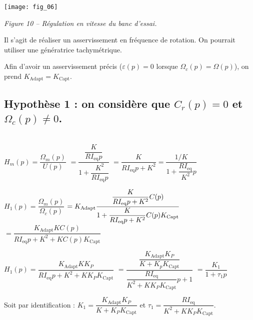 \begin{multicols}{2}
\begin{center}
\texttt{[image: fig\_06]}

\textit{Figure 10 -- Régulation en vitesse du banc d'essai.}
\end{center}
\fi


\ifprof
\begin{corrige}
Il s'agit de réaliser un asservissement en fréquence de rotation. On pourrait utiliser une génératrice tachymétrique. 

Afin d'avoir un asservissement précis ($\varepsilon(p)=0$ lorsque $\Omega_c(p)=\Omega(p)$), on prend $K_{\text{Adapt}}=K_{\text{Capt}}$.
\end{corrige}
\else
\fi


\subsection*{Hypothèse 1 : on considère que $C_r (p)=0$ et $\Omega_c (p)\neq 0$.}

\ifprof
\begin{corrige}
~\\

$H_m (p)=\dfrac{\Omega_m (p)}{U(p)} $
$= \dfrac{\dfrac{K}{RI_{\text{eq}}p}}{1+\dfrac{K^2}{ RI_{\text{eq}}p}}$
$=\dfrac{K}{R I_{\text{eq}} p+K^2  }=\dfrac{1/K}{1+\dfrac{RI_{\text{eq}}}{K^2}p}$


$H_1 (p)=\dfrac{\Omega_m (p)}{\Omega_c (p)} $
$=K_{\text{Adapt}} \dfrac{\dfrac{K}{R I_{\text{eq}} p+K^2 } C(p)}{%
1+\dfrac{K}{R I_{\text{eq}} p+K^2 } C(p) K_{\text{Capt}} }$
$=\dfrac{K_{\text{Adapt}} K C(p)}{R I_{\text{eq}} p+K^2+K C(p) K_{\text{Capt}} }$


$H_1 (p)=\dfrac{K_{\text{Adapt}} K K_P}{R I_{\text{eq}} p+K^2+K K_P K_{\text{Capt}}}$
$=\dfrac{\dfrac{K_{\text{Adapt}} K_P}{K+K_p K_{\text{Capt}}}}{\dfrac{R I_{\text{eq}}}{K^2+K K_P K_{\text{Capt}}} p+1}$
$=\dfrac{K_1}{1+\tau_1 p}$


Soit par identification : $K_1=\dfrac{K_{\text{Adapt}} K_P}{K+K_P K_{\text{Capt}}}$	et	$\tau_1=\dfrac{R I_{\text{eq}}}{K^2+K K_P K_{\text{Capt}}}$.





\end{corrige}
\end{multicols}
